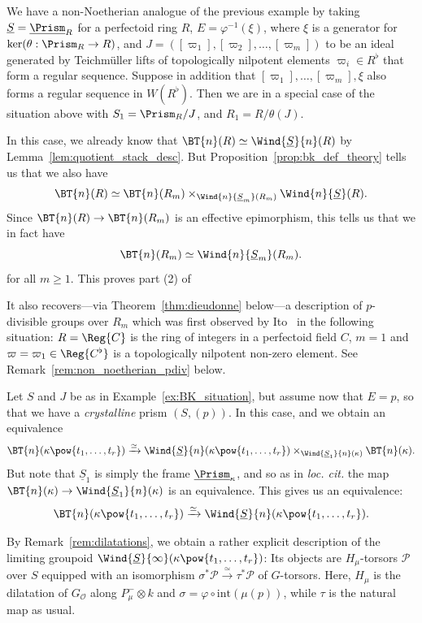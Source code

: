 \documentclass[10pt]{amsart}
\begin{document}
\begin{example}
\label{ex:non_noetherian_situation}
We have a non-Noetherian analogue of the previous example by taking $\underline{S} = \underline{\Prism}_R$ for a perfectoid ring $R$, $E = \varphi^{-1}(\xi)$, where $\xi$ is a generator for $\ker(\theta:\Prism_R\to R)$, and $J = ([\varpi_1],[\varpi_2],\ldots,[\varpi_m])$ to be an ideal generated by Teichm\"uller lifts of topologically nilpotent elements $\varpi_i\in R^\flat$ that form a regular sequence. Suppose in addition that $[\varpi_1],\ldots,[\varpi_m],\xi$ also forms a regular sequence in $W(R^\flat)$. Then we are in a special case of the situation above with $S_1 = \Prism_R/J$, and $R_1 = R/\theta(J)$. 

In this case, we already know that $\BT{n}(R) \simeq \Wind{\underline{S}}{n}(R)$ by Lemma~\ref{lem:quotient_stack_desc}. But Proposition~\ref{prop:bk_def_theory} tells us that we also have
\[
\BT{n}(R)\simeq \BT{n}(R_m)\times_{\Wind{n}{\underline{S}_m}(R_m)}\Wind{n}{\underline{S}}(R).
\]
Since $\BT{n}(R)\to \BT{n}(R_m)$ is an effective epimorphism, this tells us that we in fact have
\[
\BT{n}(R_m)\simeq \Wind{n}{\underline{S}_m}(R_m).
\]
for all $m\ge 1$. This proves part (2) of~\cite[Conjecture 7.1.2]{ito2023deformation}

It also recovers---via Theorem~\ref{thm:dieudonne} below---a description of $p$-divisible groups over $R_m$ which was first observed by Ito~\cite[Theorem 6.3.6]{ito2023deformation} in the following situation: $R = \Reg{C}$ is the ring of integers in a perfectoid field $C$, $m=1$ and $\varpi = \varpi_1\in \Reg{C^\flat}$ is a topologically nilpotent non-zero element. See Remark~\ref{rem:non_noetherian_pdiv} below. 
\end{example} 

\begin{example}
\label{ex:faltings_situation}
  Let $S$ and $J$ be as in Example~\ref{ex:BK_situation}, but assume now that $E = p$, so that we have a \emph{crystalline} prism $(S,(p))$. In this case, and we obtain an equivalence
    \[
    \BT{n}(\kappa\pow{t_1,\ldots,t_r})\xrightarrow{\simeq}\Wind{\underline{S}}{n}(\kappa\pow{t_1,\ldots,t_r})\times_{\Wind{\underline{S}_1}{n}(\kappa)}\BT{n}(\kappa).
    \]
    But note that $\underline{S}_1$ is simply the frame $\underline{\Prism}_\kappa$, and so as in \emph{loc. cit.} the map $\BT{n}(\kappa)\to \Wind{\underline{S}_1}{n}(\kappa)$ is an equivalence. This gives us an equivalence:
   \[
     \BT{n}(\kappa\pow{t_1,\ldots,t_r})\xrightarrow{\simeq}\Wind{\underline{S}}{n}(\kappa\pow{t_1,\ldots,t_r}).
    \]

   By Remark~\ref{rem:dilatations}, we obtain a rather explicit description of the limiting groupoid $\Wind{\underline{S}}{\infty}(\kappa\pow{t_1,\ldots,t_r})$: Its objects are $H_\mu$-torsors $\mathcal{P}$ over $S$ equipped with an isomorphism $\sigma^* \mathcal{P}\xrightarrow{\simeq}\tau^* \mathcal{P}$ of $G$-torsors. Here, $H_\mu$ is the dilatation of $G_{\mathcal{O}}$ along $P^-_\mu\otimes k$ and $\sigma = \varphi\circ \mathrm{int}(\mu(p))$, while $\tau$ is the natural map as usual.
 \end{example}
\end{document}
